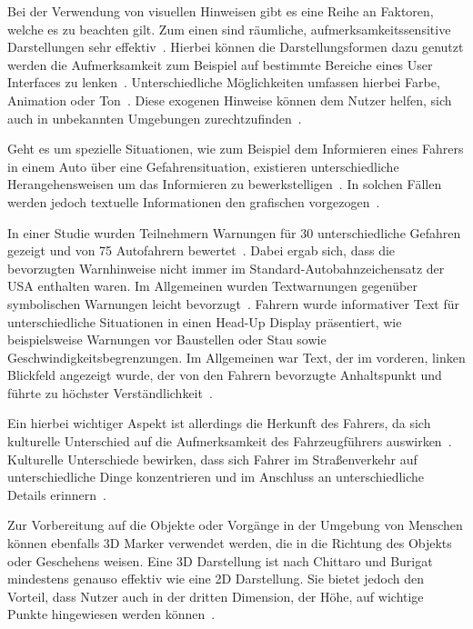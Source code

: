 Bei der Verwendung von visuellen Hinweisen gibt es eine Reihe an Faktoren, welche es zu beachten gilt. Zum einen sind räumliche, aufmerksamkeitssensitive Darstellungen sehr effektiv~\cite{bonanni2005attention}. Hierbei können die Darstellungsformen dazu genutzt werden die Aufmerksamkeit zum Beispiel auf bestimmte Bereiche eines User Interfaces zu lenken~\cite{keller1994visual}. Unterschiedliche Möglichkeiten umfassen hierbei Farbe, Animation oder Ton~\cite{keller1994visual}. Diese exogenen Hinweise können dem Nutzer helfen, sich auch in unbekannten Umgebungen zurechtzufinden~\cite{bonanni2005attention}.

Geht es um spezielle Situationen, wie zum Beispiel dem Informieren eines Fahrers in einem Auto über eine Gefahrensituation, existieren unterschiedliche Herangehensweisen um das Informieren zu bewerkstelligen~\cite{keller1994visual}. In solchen Fällen werden jedoch textuelle Informationen den grafischen vorgezogen~\cite{green1995driver}.

In einer Studie wurden Teilnehmern Warnungen für 30 unterschiedliche Gefahren gezeigt und von 75 Autofahrern bewertet~\cite{green1995driver}. 
Dabei ergab sich, dass die bevorzugten Warnhinweise nicht immer im Standard-Autobahnzeichensatz der USA enthalten waren. 
Im Allgemeinen wurden Textwarnungen gegenüber symbolischen Warnungen leicht bevorzugt~\cite{green1995driver}.
Fahrern wurde informativer Text für unterschiedliche Situationen in einen Head-Up Display präsentiert, wie beispielsweise Warnungen vor Baustellen oder Stau sowie Geschwindigkeitsbegrenzungen. 
Im Allgemeinen war Text, der im vorderen, linken Blickfeld angezeigt wurde, der von den Fahrern bevorzugte Anhaltspunkt und führte zu höchster Verständlichkeit~\cite{green1995driver}.

Ein hierbei wichtiger Aspekt ist allerdings die Herkunft des Fahrers, da sich kulturelle Unterschied auf die Aufmerksamkeit des Fahrzeugführers auswirken~\cite{shinohara2017visual}.
Kulturelle Unterschiede bewirken, dass sich Fahrer im Straßenverkehr auf unterschiedliche Dinge konzentrieren und im Anschluss an unterschiedliche Details erinnern~\cite{shinohara2017visual}.

Zur Vorbereitung auf die Objekte oder Vorgänge in der Umgebung von Menschen können ebenfalls 3D Marker verwendet werden, die in die Richtung des Objekts oder Geschehens weisen. Eine 3D Darstellung ist nach Chittaro und Burigat mindestens genauso effektiv wie eine 2D Darstellung. Sie bietet jedoch den Vorteil, dass Nutzer auch in der dritten Dimension, der Höhe, auf wichtige Punkte hingewiesen werden können~\cite{chittaro20043d}.
